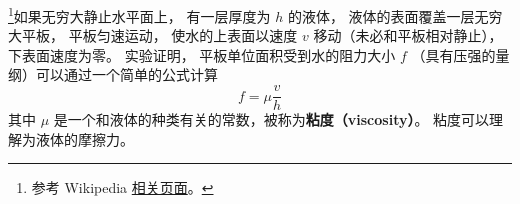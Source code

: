 
\begin{issues}
\issueDraft
\end{issues}

\footnote{参考 Wikipedia \href{https://en.wikipedia.org/wiki/Viscosity}{相关页面}。}如果无穷大静止水平面上， 有一层厚度为 $h$ 的液体， 液体的表面覆盖一层无穷大平板， 平板匀速运动， 使水的上表面以速度 $v$ 移动（未必和平板相对静止）， 下表面速度为零。 实验证明， 平板单位面积受到水的阻力大小 $f$ （具有压强的量纲）可以通过一个简单的公式计算
\begin{equation}
f = \mu \frac{v}{h}
\end{equation}
其中 $\mu$ 是一个和液体的种类有关的常数，被称为\textbf{粘度（viscosity）}。 粘度可以理解为液体的摩擦力。
